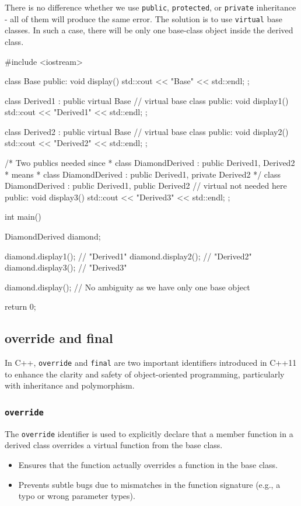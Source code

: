 \documentclass[../main]{subfiles}
\begin{document}
There is no difference whether we use \texttt{public}, \texttt{protected}, or \texttt{private} inheritance - all of them will
produce the same error. The solution is to use \texttt{virtual} base classes. In such a case, there will be only one base-class object inside the derived class.
\begin{Code}
    #include <iostream>
    
    class Base
    {
    public:
        void display() { std::cout << "Base" << std::endl; }
    };
    
    class Derived1 : public virtual Base  // virtual base class
    {
    public:
        void display1() { std::cout << "Derived1" << std::endl; }
    };
    
    class Derived2 : public virtual Base  // virtual base class
    {
    public:
        void display2() { std::cout << "Derived2" << std::endl; }
    };
    
    /* Two publics needed since
     *     class DiamondDerived : public Derived1, Derived2
     * means
     *     class DiamondDerived : public Derived1, private Derived2
     */
    class DiamondDerived : public Derived1, public Derived2  // virtual not needed here
    {
    public:
        void display3() { std::cout << "Derived3" << std::endl; }
    };
    
    int main()
    {
        DiamondDerived diamond;
    
        diamond.display1(); // "Derived1"
        diamond.display2(); // "Derived2"
        diamond.display3(); // "Derived3"
        
        diamond.display(); // No ambiguity as we have only one base object
    
        return 0;
    }
\end{Code}

\subsection{override and final}
    In C++, \texttt{override} and \texttt{final} are two important
identifiers introduced in C++11 to enhance the clarity and safety of
object-oriented programming, particularly with inheritance and
polymorphism. 

\subsubsection{\texttt{override}}
    The \texttt{override} identifier is used to explicitly declare
that a member function in a derived class overrides a virtual function from the base class.
\begin{itemize}
    \item Ensures that the function actually overrides a function in the base class.
    \item Prevents subtle bugs due to mismatches in the function signature (e.g., a typo or wrong parameter types).
\end{itemize}
\end{document}
